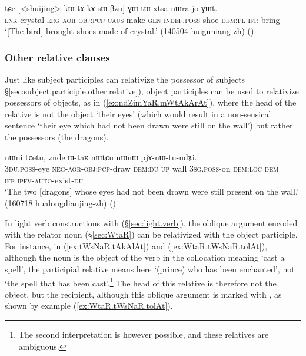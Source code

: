 \begin{exe}
\ex \label{ex:tAkAsWBzu.GW.tWxtsa}
\gll  tɕe [<shuijing> kɯ tɤ-kɤ-sɯ-βzu] ɣɯ tɯ-xtsa nɯra jo-ɣɯt. \\
\textsc{lnk} crystal \textsc{erg} \textsc{aor}-\textsc{obj}:\textsc{pcp}-\textsc{caus}-make \textsc{gen} \textsc{indef}.\textsc{poss}-shoe \textsc{dem}:\textsc{pl} \textsc{ifr}-bring \\
\glt `[The bird] brought shoes made of crystal.' (140504 huiguniang-zh)
()
\end{exe}

\subsubsection{Other relative clauses}  \label{sec:object.participle.other.relative}
Just like subject participles can relativize the possessor of subjects §\ref{sec:subject.participle.other.relative}), object participles can be used to relativize possessors of objects, as in (\ref{ex:ndZimYaR.mWtAkArAt}), where the head of the relative  is not the object `their eyes' (which would result in a non-sensical sentence `their eye which had not been drawn were still on the wall') but rather the possessors (the dragons).

\begin{exe}
\ex \label{ex:ndZimYaR.mWtAkArAt}
 nɯni tɕetu, znde ɯ-taʁ nɯtɕu nɯnɯ pjɤ-nɯ-tu-ndʑi. \\
\textsc{3du}.\textsc{poss}-eye \textsc{neg}-\textsc{aor}-\textsc{obj}:\textsc{pcp}-draw \textsc{dem}:\textsc{du} \textsc{up} wall \textsc{3sg}.\textsc{poss}-on \textsc{dem}:\textsc{loc} \textsc{dem} \textsc{ifr}.\textsc{ipfv}-\textsc{auto}-exist-\textsc{du} \\
\glt `The two [dragons] whose eyes had not been drawn were still present on the wall.' (160718 hualongdianjing-zh)
()
\end{exe}

In light verb constructions with  (§\ref{sec:light.verb}), the oblique argument encoded with the relator noun  (§\ref{sec:WtaR}) can be relativized with the object participle. For instance, in (\ref{ex:tWsNaR.tAkAlAt}) and (\ref{ex:WtaR.tWsNaR.tolAt}), although the noun  is the object of the verb  in the collocation meaning `cast a spell', the participial relative  means here  `(prince) who has been enchanted', not `the spell that has been cast'.\footnote{The second interpretation is however possible, and these relatives are ambiguous. } The head of this relative is therefore not the object, but the recipient, although this oblique argument is marked with , as shown by example (\ref{ex:WtaR.tWsNaR.tolAt}).

